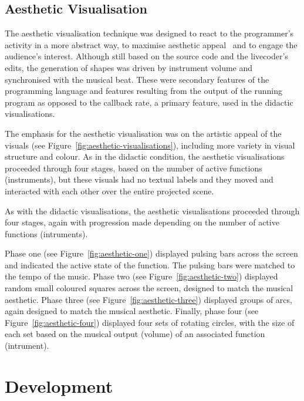\subsection{Aesthetic Visualisation}
\label{sec:aesthetic-visualisation}



The aesthetic visualisation technique was designed to react to the programmer's activity in a more abstract way, to maximise aesthetic appeal~\cite{Cawthon2007} and to engage the audience's interest. Although still based on the source code and the livecoder's edits, the generation of shapes was driven by instrument volume and synchronised with the musical beat. These were secondary features of the programming language and features resulting from the output of the running program as opposed to the callback rate, a primary feature, used in the didactic visualisations.

The emphasis for the aesthetic visualisation was on the artistic appeal of the visuals (see Figure~\ref{fig:aesthetic-visualisations}), including more variety in visual structure and colour. As in the didactic condition, the aesthetic visualisations proceeded through four stages, based on the number of active functions (instruments), but these visuals had no textual labels and they moved and interacted with each other over the entire projected scene.

As with the didactic visualisations, the aesthetic visualisations proceeded through four stages, again with progression made depending on the number of active functions (intruments).

Phase one (see Figure~\ref{fig:aesthetic-one}) displayed pulsing bars across the screen and indicated the active state of the function. The pulsing bars were matched to the tempo of the music. Phase two (see Figure~\ref{fig:aesthetic-two}) displayed random small coloured squares across the screen, designed to match the musical aesthetic. Phase three (see Figure~\ref{fig:aesthetic-three}) displayed groups of arcs, again designed to match the musical aesthetic. Finally, phase four (see Figure~\ref{fig:aesthetic-four}) displayed four sets of rotating circles, with the size of each set based on the musical output (volume) of an associated function (intrument).

\section{Development}

